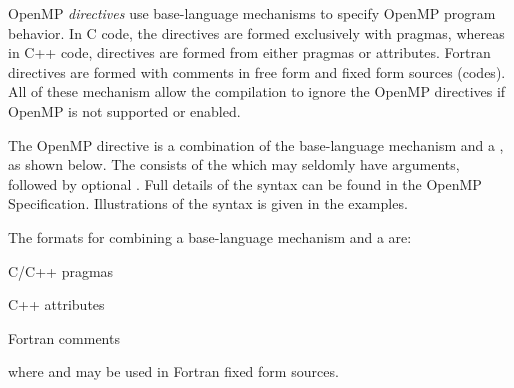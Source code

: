\label{chap:directive_syntax}

OpenMP \emph{directives} use base-language mechanisms to specify OpenMP program behavior.
In C code, the directives are formed exclusively with pragmas, whereas in C++
code, directives are formed from either pragmas or attributes.
Fortran directives are formed with comments in free form and fixed form sources (codes).
All of these mechanism allow the compilation to ignore the OpenMP directives if
OpenMP is not supported or enabled.


The OpenMP directive is a combination of the base-language mechanism and a ,
as shown below. The  consists
of the  which may seldomly have arguments, 
followed by optional . Full details of the syntax can be found in the OpenMP Specification.
Illustrations of the syntax is given in the examples.

The formats for combining a base-language mechanism and a  are:

C/C++ pragmas
\begin{indentedcodelist}
 
\end{indentedcodelist}

C++ attributes
\begin{indentedcodelist}
\code{[[omp :: directive(}  \code{)]]}
\code{[[using omp : directive(}  \code{)]]}
\end{indentedcodelist}

Fortran comments
\begin{indentedcodelist}
 
\end{indentedcodelist}

where  and  may be used in Fortran fixed form sources.








